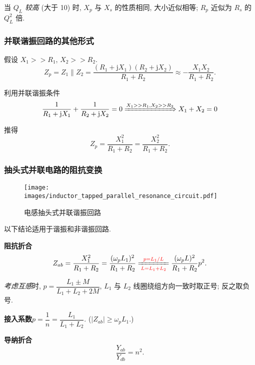 当 $Q_L$ \textit{较高} (大于 10) 时, $X_p$ 与 $X_s$ 的性质相同, 大小近似相等; $R_p$ 近似为 $R_s$ 的 $Q_L^2$ 倍.

\subsubsection{并联谐振回路的其他形式}

假设 $X_1>>R_1$, $X_2>>R_2$.
\begin{equation}
    Z_p=Z_1\parallel Z_2=\frac{(R_1+\mathrm{j}X_1)(R_2+\mathrm{j}X_2)}{R_1+R_2}\approx-\frac{X_1X_2}{R_1+R_2}.
\end{equation}

利用并联谐振条件
\begin{equation} \label{eq:2.3 并联谐振条件}
    \frac{1}{R_1+\mathrm{j}X_1}+\frac{1}{R_2+\mathrm{j}X_2}=0 \xRightarrow{X_1>>R_1,X_2>>R_2} X_1+X_2=0
\end{equation}

\noindent 推得
\begin{equation}
    Z_p=\frac{X_1^2}{R_1+R_2}=\frac{X_2^2}{R_1+R_2}.
\end{equation}

\subsubsection{抽头式并联电路的阻抗变换}

\begin{wrapfigure}{r}{.38\textwidth}
    \centering
    \texttt{[image: images/inductor\_tapped\_parallel\_resonance\_circuit.pdf]}
    \caption{电感抽头式并联谐振回路}
\end{wrapfigure}

以下结论适用于谐振和非谐振回路.

\textbf{阻抗折合}
\begin{equation}
    Z_{ab}=\frac{X_1^2}{R_1+R_2}=\frac{(\omega_p L_1)^2}{R_1+R_2}\xlongequal[{\color{red} L=L_1+L_2}]{{\color{red} p=L_1/L}}\frac{(\omega_p L)^2}{R_1+R_2}p^2.
\end{equation}

\textit{考虑互感}时, $p=\dfrac{L_1\pm M}{L_1+L_2+2M}$, $L_1$ 与 $L_2$ 线圈绕组方向一致时取正号; 反之取负号.

\textbf{接入系数}\quad $p=\dfrac{1}{n}=\dfrac{L_1}{L_1+L_2}$. ($|Z_{ab}|\geq \omega_pL_1$.)

\textbf{导纳折合}
\begin{equation}
    \frac{Y_{ab}}{Y_{db}}=n^2.
\end{equation}

